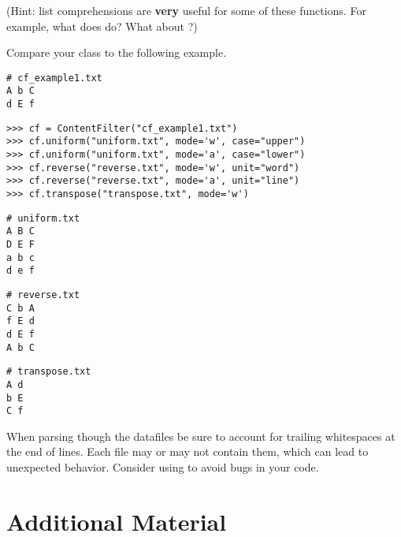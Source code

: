 \begin{problem}
\begin{enumerate}
\end{enumerate}

(Hint: list comprehensions are \textbf{very} useful for some of these functions.
For example, what does  do?
What about ?)

Compare your class to the following example.

\begin{lstlisting}
# cf_example1.txt
A b C
d E f
\end{lstlisting}

\begin{lstlisting}
>>> cf = ContentFilter("cf_example1.txt")
>>> cf.uniform("uniform.txt", mode='w', case="upper")
>>> cf.uniform("uniform.txt", mode='a', case="lower")
>>> cf.reverse("reverse.txt", mode='w', unit="word")
>>> cf.reverse("reverse.txt", mode='a', unit="line")
>>> cf.transpose("transpose.txt", mode='w')
\end{lstlisting}

\begin{lstlisting}
# uniform.txt
A B C
D E F
a b c
d e f
\end{lstlisting}

\begin{lstlisting}
# reverse.txt
C b A
f E d
d E f
A b C
\end{lstlisting}

\begin{lstlisting}
# transpose.txt
A d
b E
C f
\end{lstlisting}

\begin{warn} %
    When parsing though the datafiles be sure to account for trailing whitespaces at the end of lines.
    Each file may or may not contain them, which can lead to unexpected behavior.
    Consider using  to avoid bugs in your code.
\end{warn}

\end{problem}

\newpage

\section*{Additional Material} %

